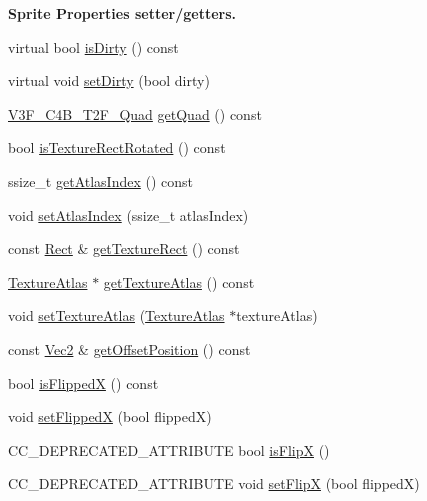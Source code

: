 \begin{Indent}\textbf{ Sprite Properties\textquotesingle{} setter/getters.}\par
\begin{DoxyCompactItemize}
\item 
virtual bool \hyperlink{classSprite_a206dfe184b32e6a9666b07246478a700}{is\+Dirty} () const
\item 
virtual void \hyperlink{classSprite_a7e621efdc4116feff17eba4ff93dcead}{set\+Dirty} (bool dirty)
\item 
\hyperlink{structV3F__C4B__T2F__Quad}{V3\+F\+\_\+\+C4\+B\+\_\+\+T2\+F\+\_\+\+Quad} \hyperlink{classSprite_abc0684e4913ae8aefb0f72c48c2514d1}{get\+Quad} () const
\item 
bool \hyperlink{classSprite_a917556f400941297e60a749c4dd01847}{is\+Texture\+Rect\+Rotated} () const
\item 
ssize\+\_\+t \hyperlink{classSprite_a6ba2e30af077e193e2aff281e89091a8}{get\+Atlas\+Index} () const
\item 
void \hyperlink{classSprite_aa3455e2c6a468008225d04e744d626f9}{set\+Atlas\+Index} (ssize\+\_\+t atlas\+Index)
\item 
const \hyperlink{classRect}{Rect} \& \hyperlink{classSprite_a6afd5a0d3f10b55eecebd4adab4004ba}{get\+Texture\+Rect} () const
\item 
\hyperlink{classTextureAtlas}{Texture\+Atlas} $\ast$ \hyperlink{classSprite_ab4ebd2216b9e419d81581b1072ce1254}{get\+Texture\+Atlas} () const
\item 
void \hyperlink{classSprite_a66f74cd6fa807964c5a9d06d6c927e38}{set\+Texture\+Atlas} (\hyperlink{classTextureAtlas}{Texture\+Atlas} $\ast$texture\+Atlas)
\item 
const \hyperlink{classVec2}{Vec2} \& \hyperlink{classSprite_a783cd2206e8da661869af7a49ad41d7c}{get\+Offset\+Position} () const
\item 
bool \hyperlink{classSprite_af16052422347fb5a609f69191e9503e6}{is\+FlippedX} () const
\item 
void \hyperlink{classSprite_ad18ebe3330284f096db0fc6e16839633}{set\+FlippedX} (bool flippedX)
\item 
C\+C\+\_\+\+D\+E\+P\+R\+E\+C\+A\+T\+E\+D\+\_\+\+A\+T\+T\+R\+I\+B\+U\+TE bool \hyperlink{classSprite_adec29867c0c49bb6f5642a377348da3d}{is\+FlipX} ()
\item 
C\+C\+\_\+\+D\+E\+P\+R\+E\+C\+A\+T\+E\+D\+\_\+\+A\+T\+T\+R\+I\+B\+U\+TE void \hyperlink{classSprite_ac10f5904c04e3cb5e6e982f88d1e9d04}{set\+FlipX} (bool flippedX)
\item 

\end{DoxyCompactItemize}
\end{Indent}
